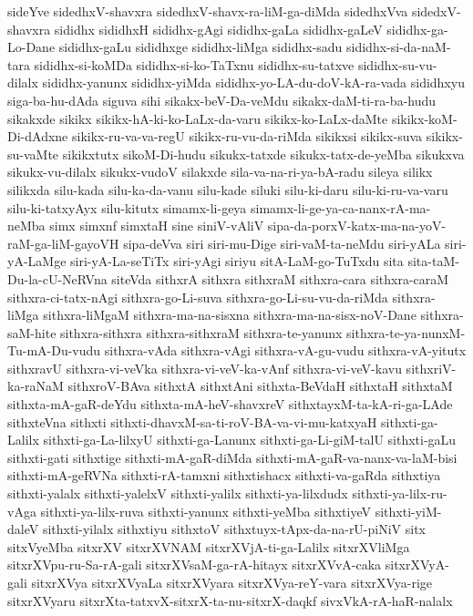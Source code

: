{sideYve
sidedhxV-shavxra
sidedhxV-shavx-ra-liM-ga-diMda
sidedhxVva
sidedxV-shavxra
sididhx
sididhxH
sididhx-gAgi
sididhx-gaLa
sididhx-gaLeV
sididhx-ga-Lo-Dane
sididhx-gaLu
sididhxge
sididhx-liMga
sididhx-sadu
sididhx-si-da-naM-tara
sididhx-si-koMDa
sididhx-si-ko-TaTxnu
sididhx-su-tatxve
sididhx-su-vu-dilalx
sididhx-yanunx
sididhx-yiMda
sididhx-yo-LA-du-doV-kA-ra-vada
sididhxyu
siga-ba-hu-dAda
siguva
sihi
sikakx-beV-Da-veMdu
sikakx-daM-ti-ra-ba-hudu
sikakxde
sikikx
sikikx-hA-ki-ko-LaLx-da-varu
sikikx-ko-LaLx-daMte
sikikx-koM-Di-dAdxne
sikikx-ru-va-va-regU
sikikx-ru-vu-da-riMda
sikikxsi
sikikx-suva
sikikx-su-vaMte
sikikxtutx
sikoM-Di-hudu
sikukx-tatxde
sikukx-tatx-de-yeMba
sikukxva
sikukx-vu-dilalx
sikukx-vudoV
silakxde
sila-va-na-ri-ya-bA-radu
sileya
silikx
silikxda
silu-kada
silu-ka-da-vanu
silu-kade
siluki
silu-ki-daru
silu-ki-ru-va-varu
silu-ki-tatxyAyx
silu-kitutx
simamx-li-geya
simamx-li-ge-ya-ca-nanx-rA-ma-neMba
simx
simxnf
simxtaH
sine
siniV-vAliV
sipa-da-porxV-katx-ma-na-yoV-raM-ga-liM-gayoVH
sipa-deVva
siri
siri-mu-Dige
siri-vaM-ta-neMdu
siri-yALa
siri-yA-LaMge
siri-yA-La-seTiTx
siri-yAgi
siriyu
sitA-LaM-go-TuTxdu
sita
sita-taM-Du-la-cU-NeRVna
siteVda
sithxrA
sithxra
sithxraM
sithxra-cara
sithxra-caraM
sithxra-ci-tatx-nAgi
sithxra-go-Li-suva
sithxra-go-Li-su-vu-da-riMda
sithxra-liMga
sithxra-liMgaM
sithxra-ma-na-sisxna
sithxra-ma-na-sisx-noV-Dane
sithxra-saM-hite
sithxra-sithxra
sithxra-sithxraM
sithxra-te-yanunx
sithxra-te-ya-nunxM-Tu-mA-Du-vudu
sithxra-vAda
sithxra-vAgi
sithxra-vA-gu-vudu
sithxra-vA-yitutx
sithxravU
sithxra-vi-veVka
sithxra-vi-veV-ka-vAnf
sithxra-vi-veV-kavu
sithxriV-ka-raNaM
sithxroV-BAva
sithxtA
sithxtAni
sithxta-BeVdaH
sithxtaH
sithxtaM
sithxta-mA-gaR-deYdu
sithxta-mA-heV-shavxreV
sithxtayxM-ta-kA-ri-ga-LAde
sithxteVna
sithxti
sithxti-dhavxM-sa-ti-roV-BA-va-vi-mu-katxyaH
sithxti-ga-Lalilx
sithxti-ga-La-lilxyU
sithxti-ga-Lanunx
sithxti-ga-Li-giM-talU
sithxti-gaLu
sithxti-gati
sithxtige
sithxti-mA-gaR-diMda
sithxti-mA-gaR-va-nanx-va-laM-bisi
sithxti-mA-geRVNa
sithxti-rA-tamxni
sithxtishacx
sithxti-va-gaRda
sithxtiya
sithxti-yalalx
sithxti-yalelxV
sithxti-yalilx
sithxti-ya-lilxdudx
sithxti-ya-lilx-ru-vAga
sithxti-ya-lilx-ruva
sithxti-yanunx
sithxti-yeMba
sithxtiyeV
sithxti-yiM-daleV
sithxti-yilalx
sithxtiyu
sithxtoV
sithxtuyx-tApx-da-na-rU-piNiV
sitx
sitxVyeMba
sitxrXV
sitxrXVNAM
sitxrXVjA-ti-ga-Lalilx
sitxrXVliMga
sitxrXVpu-ru-Sa-rA-gali
sitxrXVsaM-ga-rA-hitayx
sitxrXVvA-caka
sitxrXVyA-gali
sitxrXVya
sitxrXVyaLa
sitxrXVyara
sitxrXVya-reY-vara
sitxrXVya-rige
sitxrXVyaru
sitxrXta-tatxvX-sitxrX-ta-nu-sitxrX-daqkf
sivxVkA-rA-haR-nalalx
}
